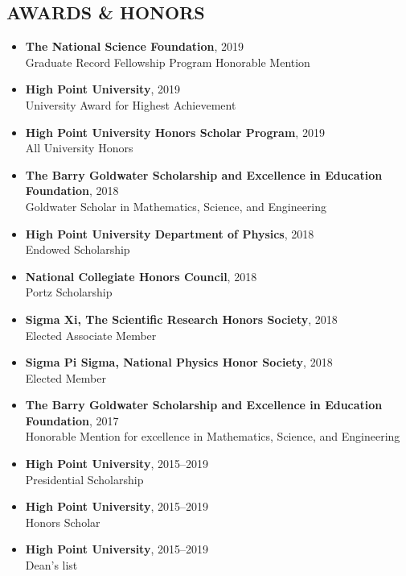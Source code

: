 \documentclass[margin, 10pt]{res} %
\begin{document}
\begin{resume}
\section{AWARDS \& HONORS}
\begin{itemize}
    \item \textbf{{\scriptsize The National Science Foundation}}, {\small 2019}\\Graduate Record Fellowship Program Honorable Mention
    \item \textbf{{\scriptsize High Point University}},
    {\small 2019}\\University Award for Highest Achievement
    \item \textbf{{\scriptsize High Point University Honors Scholar Program}},
    {\small 2019}\\All University Honors
	\item \textbf{{\scriptsize The Barry Goldwater Scholarship and Excellence in Education Foundation}}, {\small 2018}\\Goldwater Scholar in Mathematics, Science, and Engineering 
    \item \textbf{{\scriptsize High Point University Department of Physics}}, {\small 2018}\\Endowed Scholarship
    \item {\scriptsize \textbf{National Collegiate Honors Council}}, {\small 2018}\\Portz Scholarship
    \item \textbf{{\scriptsize Sigma Xi, The Scientific Research Honors Society}}, {\small 2018}\\Elected Associate Member
     \item \textbf{{\scriptsize Sigma Pi Sigma, National Physics Honor Society}}, {\small 2018}\\Elected Member
    \item \textbf{{\scriptsize The Barry Goldwater Scholarship and Excellence in Education Foundation}}, {\small 2017}\\Honorable Mention for excellence in Mathematics, Science, and Engineering 
	\item \textbf{{\scriptsize High Point University}}, {\small 2015--2019}\\Presidential Scholarship
    \item \textbf{{\scriptsize High Point University}}, {\small 2015--2019}\\Honors Scholar
    \item \textbf{{\scriptsize High Point University}}, {\small 2015--2019}\\Dean's list
\end{itemize}


\end{resume}
\end{document}
